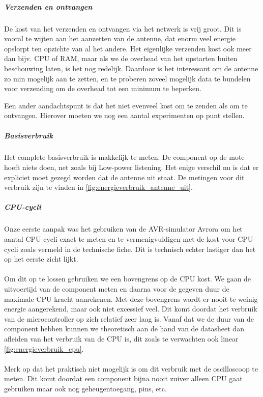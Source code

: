 \documentclass{article}
\begin{document}
\subparagraph{Verzenden en ontvangen}

De kost van het verzenden en ontvangen via het netwerk is vrij groot. Dit is
vooral te wijten aan het aanzetten van de antenne, dat enorm veel energie
opslorpt ten opzichte van al het andere. Het eigenlijke verzenden kost ook meer
dan bijv. CPU of RAM, maar als we de overhead van het opstarten buiten
beschouwing laten, is het nog redelijk. Daardoor is het interessant om de
antenne zo min mogelijk aan te zetten, en te proberen zoveel mogelijk data te
bundelen voor verzending om de overhead tot een minimum te beperken.

Een ander aandachtspunt is dat het niet evenveel kost om te zenden als om te
ontvangen. Hierover moeten we nog een aantal experimenten op punt stellen.

\subparagraph{Basisverbruik}

Het complete basisverbruik is makkelijk te meten. De component op de mote hoeft niets doen, net zoals bij Low-power listening. Het enige verschil nu is dat er expliciet moet gezegd worden dat de antenne uit staat.
De metingen voor dit verbruik zijn te vinden in \ref{fig:energieverbruik_antenne_uit}.

\subparagraph{CPU-cycli}

Onze eerste aanpak was het gebruiken van de AVR-simulator Avrora
\cite{titzer2005avrora} om het aantal CPU-cycli exact te meten en te
vermenigvuldigen met de kost voor CPU-cycli zoals vermeld in de technische
fiche. Dit is technisch echter lastiger dan het op het eerste zicht lijkt.
\\
\\
Om dit op te lossen gebruiken we een bovengrens op de CPU kost. We gaan de uitvoertijd van de component meten en daarna voor de gegeven duur de maximale CPU kracht aanrekenen. Met deze bovengrens wordt er nooit te weinig energie aangerekend, maar ook niet excessief veel. Dit komt doordat het verbruik van de microcontroller op zich relatief zeer laag is. Vanaf dat we de duur van de component hebben kunnen we theoretisch aan de hand van de datasheet dan afleiden van het verbruik van de CPU is, dit zoals te verwachten ook linear \ref{fig:energieverbruik_cpu}.\\
\\
Merk op dat het praktisch niet mogelijk is om dit verbruik met de oscilloscoop te meten.
Dit komt doordat een component bijna nooit zuiver alleen CPU gaat gebruiken maar ook nog geheugentoegang, pins, etc. 
\end{document}
